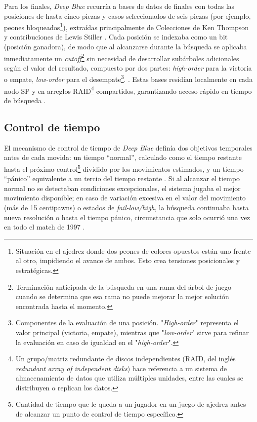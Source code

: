 \documentclass[a4paper, 12pt]{article}
\begin{document}
Para los finales, \textit{Deep Blue} recurría a bases de datos 
de finales con todas las posiciones de hasta cinco piezas y 
casos seleccionados de seis piezas (por ejemplo, peones 
bloqueados\footnote{Situación en el ajedrez donde dos peones de colores opuestos están uno frente al otro, impidiendo el avance de ambos. Esto crea tensiones posicionales y estratégicas.}), 
extraídas principalmente de Colecciones de Ken 
Thompson \cite{thompson1986retrograde} y contribuciones de Lewis Stiller \cite{campbell2002deep}. 
Cada posición se indexaba como un bit (posición ganadora), de 
modo que al alcanzarse durante la búsqueda se aplicaba 
inmediatamente un \emph{cutoff}\footnote{Terminación anticipada de la búsqueda en una rama del árbol de juego cuando se determina que esa rama no puede mejorar la mejor solución encontrada hasta el momento.} 
sin necesidad de desarrollar subárboles 
adicionales según el valor del resultado, 
compuesto por dos partes: 
\emph{high-order} para la victoria o empate, \emph{low-order} 
para el desempate\footnote{Componentes de la evaluación de una posición. "\emph{High-order}" representa el valor principal (victoria, empate), mientras que "\emph{low-order}" sirve para refinar la evaluación en caso de igualdad en el "\emph{high-order}".}. 
\cite{campbell2002deep}. Estas bases residían localmente 
en cada nodo SP y en arreglos RAID\footnote{Un grupo/matriz redundante de discos independientes (RAID, del inglés \emph{redundant array of independent disks}) 
hace referencia a un sistema de almacenamiento de datos que 
utiliza múltiples unidades, entre las cuales se distribuyen o 
replican los datos.} compartidos, garantizando 
acceso rápido en tiempo de búsqueda \cite{campbell2002deep}.

\subsection{Control de tiempo}

El mecanismo de control de tiempo de \textit{Deep Blue} definía 
dos objetivos temporales antes de cada movida: un tiempo 
“normal”, calculado como el tiempo restante hasta el próximo 
control\footnote{Cantidad de tiempo que le queda a un jugador en un juego de ajedrez antes de alcanzar un punto de control de tiempo específico.} 
dividido por los movimientos estimados, y un tiempo 
“pánico” equivalente a un tercio del tiempo restante 
\cite{campbell2002deep}. Si al alcanzar el tiempo normal no se 
detectaban condiciones excepcionales, el sistema jugaba el mejor 
movimiento disponible; en caso de variación excesiva en el valor 
del movimiento (más de 15 centipawns) o estados de 
\emph{fail-low/high}, la búsqueda continuaba hasta nueva 
resolución o hasta el tiempo pánico, circunstancia que solo 
ocurrió una vez en todo el match de 1997 \cite{campbell2002deep}.
\end{document}
